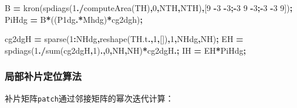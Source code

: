 \documentclass[
]{article}
\newenvironment{Shaded}{\begin{snugshade}}{\end{snugshade}}
\newcommand{\FloatTok}[1]{\textcolor[rgb]{0.00,0.00,0.81}{#1}}
\newcommand{\NormalTok}[1]{#1}
\newcommand{\OperatorTok}[1]{\textcolor[rgb]{0.81,0.36,0.00}{\textbf{#1}}}
\newcommand{\VariableTok}[1]{\textcolor[rgb]{0.00,0.00,0.00}{#1}}
\begin{document}
\begin{Shaded}
\begin{Highlighting}[]
\VariableTok{B} \OperatorTok{=} \VariableTok{kron}\NormalTok{(}\VariableTok{spdiags}\NormalTok{(}\FloatTok{1}\OperatorTok{./}\VariableTok{computeArea}\NormalTok{(}\VariableTok{TH}\NormalTok{)}\OperatorTok{,}\FloatTok{0}\OperatorTok{,}\VariableTok{NTH}\OperatorTok{,}\VariableTok{NTH}\NormalTok{)}\OperatorTok{,}\NormalTok{[}\FloatTok{9} \OperatorTok{{-}}\FloatTok{3} \OperatorTok{{-}}\FloatTok{3}\OperatorTok{;{-}}\FloatTok{3} \FloatTok{9} \OperatorTok{{-}}\FloatTok{3}\OperatorTok{;{-}}\FloatTok{3} \OperatorTok{{-}}\FloatTok{3} \FloatTok{9}\NormalTok{])}\OperatorTok{;}
\VariableTok{PiHdg} \OperatorTok{=} \VariableTok{B}\OperatorTok{*}\NormalTok{((}\VariableTok{P1dg}\OperatorTok{.\textquotesingle{}*}\VariableTok{Mhdg}\NormalTok{)}\OperatorTok{*}\VariableTok{cg2dgh}\NormalTok{)}\OperatorTok{;}

\VariableTok{cg2dgH} \OperatorTok{=} \VariableTok{sparse}\NormalTok{(}\FloatTok{1}\OperatorTok{:}\VariableTok{NHdg}\OperatorTok{,}\VariableTok{reshape}\NormalTok{(}\VariableTok{TH}\NormalTok{.}\VariableTok{t}\OperatorTok{.\textquotesingle{},}\FloatTok{1}\OperatorTok{,}\NormalTok{[])}\OperatorTok{,}\FloatTok{1}\OperatorTok{,}\VariableTok{NHdg}\OperatorTok{,}\VariableTok{NH}\NormalTok{)}\OperatorTok{;}
\VariableTok{EH} \OperatorTok{=} \VariableTok{spdiags}\NormalTok{(}\FloatTok{1}\OperatorTok{./}\VariableTok{sum}\NormalTok{(}\VariableTok{cg2dgH}\OperatorTok{,}\FloatTok{1}\NormalTok{)}\OperatorTok{.\textquotesingle{},}\FloatTok{0}\OperatorTok{,}\VariableTok{NH}\OperatorTok{,}\VariableTok{NH}\NormalTok{)}\OperatorTok{*}\VariableTok{cg2dgH}\OperatorTok{.\textquotesingle{};}
\VariableTok{IH} \OperatorTok{=} \VariableTok{EH}\OperatorTok{*}\VariableTok{PiHdg}\OperatorTok{;}
\end{Highlighting}
\end{Shaded}

\subsubsection{局部补片定位算法}\label{ux5c40ux90e8ux8865ux7247ux5b9aux4f4dux7b97ux6cd5}

补片矩阵\texttt{patch}通过邻接矩阵的幂次迭代计算：
\end{document}
